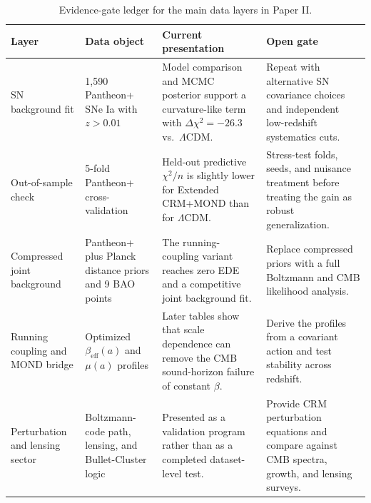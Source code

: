 \documentclass[aps,prd,twocolumn,superscriptaddress,nofootinbib]{revtex4-2}
\begin{document}
\begin{table}[t]
\centering
\caption{Evidence-gate ledger for the main data layers in Paper II.}
\label{tab:evidence_gate_ledger}
\footnotesize
\begin{tabular}{@{}llll@{}}
\toprule
\parbox[t]{0.17\textwidth}{\raggedright \textbf{Layer}} & \parbox[t]{0.21\textwidth}{\raggedright \textbf{Data object}} & \parbox[t]{0.26\textwidth}{\raggedright \textbf{Current presentation}} & \parbox[t]{0.24\textwidth}{\raggedright \textbf{Open gate}} \\
\midrule
\parbox[t]{0.17\textwidth}{\raggedright SN background fit} & \parbox[t]{0.21\textwidth}{\raggedright 1,590 Pantheon+ SNe Ia with $z>0.01$} & \parbox[t]{0.26\textwidth}{\raggedright Model comparison and MCMC posterior support a curvature-like term with $\Delta\chi^2=-26.3$ vs.\ $\Lambda$CDM.} & \parbox[t]{0.24\textwidth}{\raggedright Repeat with alternative SN covariance choices and independent low-redshift systematics cuts.} \\
\parbox[t]{0.17\textwidth}{\raggedright Out-of-sample check} & \parbox[t]{0.21\textwidth}{\raggedright 5-fold Pantheon+ cross-validation} & \parbox[t]{0.26\textwidth}{\raggedright Held-out predictive $\chi^2/n$ is slightly lower for Extended CRM+MOND than for $\Lambda$CDM.} & \parbox[t]{0.24\textwidth}{\raggedright Stress-test folds, seeds, and nuisance treatment before treating the gain as robust generalization.} \\
\parbox[t]{0.17\textwidth}{\raggedright Compressed joint background} & \parbox[t]{0.21\textwidth}{\raggedright Pantheon+ plus Planck distance priors and 9 BAO points} & \parbox[t]{0.26\textwidth}{\raggedright The running-coupling variant reaches zero EDE and a competitive joint background fit.} & \parbox[t]{0.24\textwidth}{\raggedright Replace compressed priors with a full Boltzmann and CMB likelihood analysis.} \\
\parbox[t]{0.17\textwidth}{\raggedright Running coupling and MOND bridge} & \parbox[t]{0.21\textwidth}{\raggedright Optimized $\beta_{\mathrm{eff}}(a)$ and $\mu(a)$ profiles} & \parbox[t]{0.26\textwidth}{\raggedright Later tables show that scale dependence can remove the CMB sound-horizon failure of constant $\beta$.} & \parbox[t]{0.24\textwidth}{\raggedright Derive the profiles from a covariant action and test stability across redshift.} \\
\parbox[t]{0.17\textwidth}{\raggedright Perturbation and lensing sector} & \parbox[t]{0.21\textwidth}{\raggedright Boltzmann-code path, lensing, and Bullet-Cluster logic} & \parbox[t]{0.26\textwidth}{\raggedright Presented as a validation program rather than as a completed dataset-level test.} & \parbox[t]{0.24\textwidth}{\raggedright Provide CRM perturbation equations and compare against CMB spectra, growth, and lensing surveys.} \\
\bottomrule
\end{tabular}
\end{table}
\end{document}

